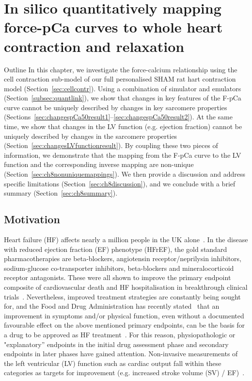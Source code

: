 \chapter{In silico quantitatively mapping force-pCa curves to whole heart contraction and relaxation}\label{cha:chapter8}
%
%
%
\begin{remark}{Outline}
    In this chapter, we investigate the force-calcium relationship using the cell contraction sub-model of our full personalised SHAM rat hart contraction model (Section~\ref{sec:cellcontr}). Using a combination of simulator and emulators (Section~\ref{subsec:quantlink}), we show that changes in key features of the F-pCa curve cannot be uniquely described by changes in key sarcomere properties (Sections~\ref{sec:changespCa50result1}--\ref{sec:changespCa50result2}). At the same time, we show that changes in the LV function (e.g. ejection fraction) cannot be uniquely described by changes in the sarcomere properties (Section~\ref{sec:changesLVfunctionresult}). By coupling these two pieces of information, we demonstrate that the mapping from the F-pCa curve to the LV function and the corresponding inverse mapping are non-unique (Section~\ref{sec:ch8nonuniquemappings}). We then provide a discussion and address specific limitations (Section~\ref{sec:ch8discussion}), and we conclude with a brief summary (Section~\ref{sec:ch8summary}).
\end{remark}


%
%
%
\section{Motivation}\label{sec:ch8motivation}
Heart failure (HF) affects nearly a million people in the UK alone~\cite{Bhf:2021}. In the disease with reduced ejection fraction (EF) phenotype (HFrEF), the gold standard pharmacotherapies are beta-blockers, angiotensin receptor/neprilysin inhibitors, sodium-glucose co-transporter inhibitors, beta-blockers and mineralocorticoid receptor antagonists. These were all shown to improve the primary endpoint composite of cardiovascular death and HF hospitalisation in breakthrough clinical trials~\cite{Debska-Kozlowska:2021}. Nevertheless, improved treatment strategies are constantly being sought for, and the Food and Drug Administration has recently stated~\cite{FDA:2019} that an improvement in symptoms and/or physical function, even without a documented favourable effect on the above mentioned primary endpoints, can be the basis for a drug to be approved as HF treatment~\cite{Fiuzat:2020}. For this reason, physiopathologic or "explanatory'' endpoints in the initial drug assessment phase and secondary endpoints in later phases have gained attention. Non-invasive measurements of the left ventricular (LV) function such as cardiac output fall within these categories as targets for improvement (e.g. increased stroke volume (SV) / EF)~\cite{Zanolla:2003}.

